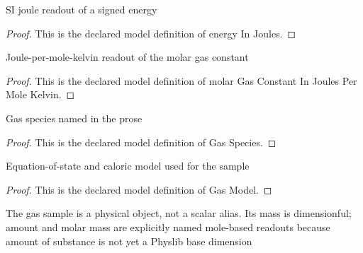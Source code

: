 \begin{definition}
  \label{def:physics:phyx-mini-0415:phyxminiproblems-problemphyxmini0415-energyinjoules}
  SI joule readout of a signed energy
\end{definition}
\begin{proof}
  This is the declared model definition of energy In Joules.
\end{proof}
\begin{definition}
  \label{def:physics:phyx-mini-0415:phyxminiproblems-problemphyxmini0415-molargasconstantinjoulespermolekelvin}
  Joule-per-mole-kelvin readout of the molar gas constant
\end{definition}
\begin{proof}
  This is the declared model definition of molar Gas Constant In Joules Per Mole Kelvin.
\end{proof}
\begin{definition}
  \label{def:physics:phyx-mini-0415:phyxminiproblems-problemphyxmini0415-gasspecies}
  Gas species named in the prose
\end{definition}
\begin{proof}
  This is the declared model definition of Gas Species.
\end{proof}
\begin{definition}
  \label{def:physics:phyx-mini-0415:phyxminiproblems-problemphyxmini0415-gasmodel}
  Equation-of-state and caloric model used for the sample
\end{definition}
\begin{proof}
  This is the declared model definition of Gas Model.
\end{proof}
\begin{definition}
  \label{def:physics:phyx-mini-0415:phyxminiproblems-problemphyxmini0415-gassample}
  The gas sample is a physical object, not a scalar alias. Its mass is dimensionful; amount and molar mass are explicitly named mole-based readouts because amount of substance is not yet a Physlib base dimension
\end{definition}
